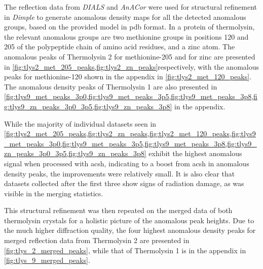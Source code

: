 The reflection data from \textit{DIALS} and \textit{AnACor} were used for structural refinement in \textit{Dimple} to generate anomalous density maps for all the detected anomalous groups, based on the provided model in \ac{pdb} format. In a protein of thermolysin, the relevant anomalous groups are two methionine groups in positions 120 and 205 of the polypeptide chain of amino acid residues, %
and a zinc atom. The anomalous peaks of Thermolysin 2 for methionine-205 and for zinc are presented in \cref{fig:tlys2_met_205_peaks,fig:tlys2_zn_peaks}respectively, with the anomalous peaks for methionine-120 shown in the appendix in \cref{fig:tlys2_met_120_peaks}. The anomalous density peaks of Thermolysin 1 are also presented in \cref{fig:tlys9_met_peaks_3p0,fig:tlys9_met_peaks_3p5,fig:tlys9_met_peaks_3p8,fig:tlys9_zn_peaks_3p0_3p5,fig:tlys9_zn_peaks_3p8} in the appendix.  %

While the majority of individual datasets seen in \cref{fig:tlys2_met_205_peaks,fig:tlys2_zn_peaks,fig:tlys2_met_120_peaks,fig:tlys9_met_peaks_3p0,fig:tlys9_met_peaks_3p5,fig:tlys9_met_peaks_3p8,fig:tlys9_zn_peaks_3p0_3p5,fig:tlys9_zn_peaks_3p8} %
exhibit the highest anomalous signal when processed with \ac{acsh}, indicating to a boost from \ac{acsh} in anomalous density peaks, the improvements were relatively small. It is also clear that datasets collected after the first three show signs of radiation damage, as was visible in the merging statistics. %

This structural refinement was then repeated on the merged data of both thermolysin crystals for a holistic picture of the anomalous peak heights. Due to the much higher diffraction quality, the four highest anomalous density peaks for merged reflection data from Thermolysin 2 are presented in \cref{fig:tlys_2_merged_peaks}, while that of Thermolysin 1 is in the appendix in \cref{fig:tlys_9_merged_peaks}.%

